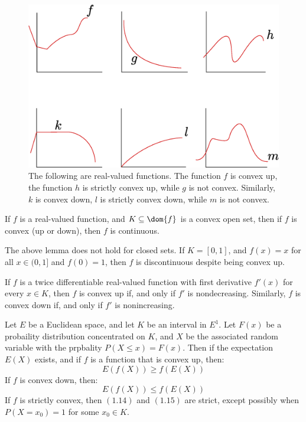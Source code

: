 \begin{figure}[h]
    \centering
    \includegraphics[scale=0.5]{Figures/Chapter1/convex_func.eps}
    \caption{The following are real-valued functions. The function $f$ is convex
        up, the function  $h$ is strictly convex up, while  $g$ is not convex.
        Similarly, $k$ is convex down, $l$ is strictly convex down, while  $m$ is
        not convex.
    }
    \label{fig_1.3}
\end{figure}

\begin{lemma}\label{1.2.2}
    If $f$ is a real-valued function, and  $K \subseteq \dom{f}$ is a convex
    open set, then if $f$ is convex (up or down), then $f$ is continuous.
\end{lemma}

\begin{example}
    The above lemma does not hold for closed sets. If $K=[0,1]$, and $f(x)=x$
    for all $x \in (0,1]$ and $f(0)=1$, then $f$ is discontinuous despite being
    convex up.
\end{example}

\begin{lemma}\label{1.2.3}
    If $f$ is a twice differentiable real-valued function with first derivative
    $f'(x)$ for every $x \in K$, then  $f$ is convex up if, and only if $f'$ is
    nondecreasing. Similarly,  $f$ is convex down if, and only if  $f'$ is
    nonincreasing.
\end{lemma}

\begin{theorem}\label{1.2.4}
    Let $E$ be a Euclidean space, and let  $K$ be an interval in  $E^1$. Let
    $F(x)$ be a probaility distribution concentrated on $K$, and  $X$ be the
    associated random variable with the prpbality  $P(X \leq x)=F(x)$. Then if
    the expectation $E(X)$ exists, and if $f$ is a function that is convex up,
    then:
    \begin{equation}
        E(f(X)) \geq f(E(X))
    \end{equation}
    If $f$ is convex down, then:
    \begin{equation}
        E(f(X)) \leq f(E(X))
    \end{equation}
    If $f$ is strictly convex, then $(1.14)$ and $(1.15)$ are strict, except
    possibly when $P(X=x_0)=1$ for some $x_0 \in K$.
\end{theorem}

